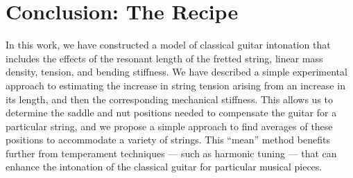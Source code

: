 %
%
%

 \section{Conclusion: The Recipe\label{sct:conc}}

 In this work, we have constructed a model of classical guitar intonation that includes the effects of the resonant length of the fretted string, linear mass density, tension, and bending stiffness. We have described a simple experimental approach to estimating the increase in string tension arising from an increase in its length, and then the corresponding mechanical stiffness. This allows us to determine the saddle and nut positions needed to compensate the guitar for a particular string, and we propose a simple approach to find averages of these positions to accommodate a variety of strings. This ``mean'' method benefits further from temperament techniques --- such as harmonic tuning --- that can enhance the intonation of the classical guitar for particular musical pieces.

